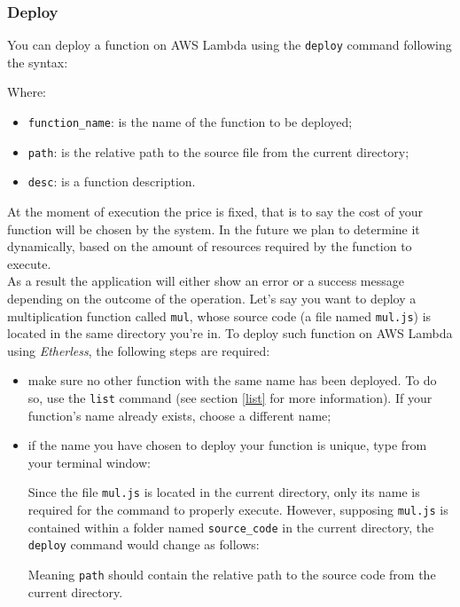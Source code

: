 \subsubsection{Deploy}\label{deploy}
You can deploy a function on AWS Lambda using the \texttt{deploy} command following the syntax:
\begin{center}
\end{center}
\noindent Where:
\begin{itemize}
	\item \texttt{function\_name}: is the name of the function to be deployed;
	\item \texttt{path}: is the relative path to the source file from the current directory;
	\item \texttt{desc}: is a function description.
\end{itemize}
At the moment of execution the price is fixed, that is to say the cost of your function will be chosen by the system. In the future we plan to determine it dynamically, based on the amount of resources required by the function to execute. \\
As a result the application will either show an error or a success message depending on the outcome of the operation.
Let's say you want to deploy a multiplication function called \texttt{mul}, whose source code (a file named \texttt{mul.js}) is located in the same directory you're in. To deploy such function on AWS Lambda using \textit{Etherless}, the following steps are required:
\begin{itemize}
\item make sure no other function with the same name has been deployed. To do so, use the \texttt{list} command (see section \ref{list} for more information). If your function's name already exists, choose a different name;
\item if the name you have chosen to deploy your function is unique, type from your terminal window:
\begin{center}
\end{center}
Since the file \texttt{mul.js} is located in the current directory, only its name is required for the command to properly execute. However, supposing \texttt{mul.js} is contained within a folder named \texttt{source\_code} in the current directory, the \texttt{deploy} command would change as follows:
\begin{center}
\end{center}
Meaning \texttt{path} should contain the relative path to the source code from the current directory.
\end{itemize}


